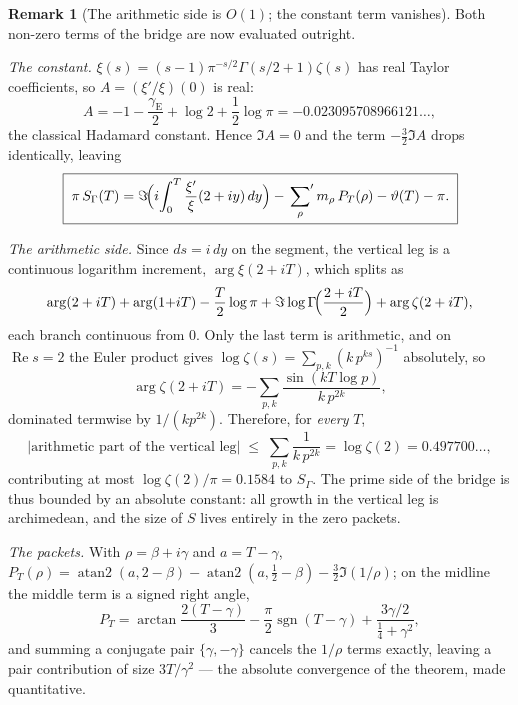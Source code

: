 \documentclass[11pt]{article}
\theoremstyle{definition}
\newtheorem{remark}[theorem]{Remark}
\renewcommand{\Re}{\operatorname{Re}}
\begin{document}
\begin{remark}[The arithmetic side is \(O(1)\); the constant term
vanishes]\label{rem:st-bridge-arithmetic-side}
Both non-zero terms of the bridge are now evaluated outright.

\emph{The constant.}  \(\xi(s)=(s-1)\pi^{-s/2}\Gamma(s/2+1)\zeta(s)\) has real
Taylor coefficients, so \(A=(\xi'/\xi)(0)\) is real:
\[
 A=-1-\frac{\gamma_{\mathrm E}}{2}+\log 2+\frac12\log\pi
  =-0.023095708966121\ldots,
\]
the classical Hadamard constant.  Hence \(\Im A=0\) and the term
\(-\tfrac32\Im A\) drops identically, leaving
\[
\boxed{\;
\pi\,S_\Gamma(T)
=\Im\!\Bigl(i\!\int_0^T\frac{\xi'}{\xi}(2+iy)\,dy\Bigr)
-\sideset{}{'}\sum_{\rho}m_\rho\,P_T(\rho)
-\vartheta(T)-\pi.\;}
\]

\emph{The arithmetic side.}  Since \(ds=i\,dy\) on the segment, the vertical
leg is a continuous logarithm increment, \(\arg\xi(2+iT)\), which splits as
\[
 \arg(2+iT)+\arg(1{+}iT)-\frac T2\log\pi
 +\Im\log\Gamma\!\Bigl(\frac{2+iT}{2}\Bigr)+\arg\zeta(2+iT),
\]
each branch continuous from \(0\).  Only the last term is arithmetic, and on
\(\Re s=2\) the Euler product gives \(\log\zeta(s)=\sum_{p,k}(k\,p^{ks})^{-1}\)
absolutely, so
\[
 \arg\zeta(2+iT)=-\sum_{p,k}\frac{\sin(kT\log p)}{k\,p^{2k}},
\]
dominated termwise by \(1/(k p^{2k})\).  Therefore, for \emph{every} \(T\),
\[
 \bigl|\text{arithmetic part of the vertical leg}\bigr|
 \;\le\;\sum_{p,k}\frac1{k\,p^{2k}}=\log\zeta(2)=0.497700\ldots,
\]
contributing at most \(\log\zeta(2)/\pi=0.1584\) to \(S_\Gamma\).  The prime
side of the bridge is thus bounded by an absolute constant: all growth in the
vertical leg is archimedean, and the size of \(S\) lives entirely in the zero
packets.

\emph{The packets.}  With \(\rho=\beta+i\gamma\) and \(a=T-\gamma\),
\(P_T(\rho)=\operatorname{atan2}(a,2-\beta)-\operatorname{atan2}(a,\tfrac12-\beta)
-\tfrac32\Im(1/\rho)\); on the midline the middle term is a signed right angle,
\[
 P_T=\arctan\frac{2(T-\gamma)}3-\frac\pi2\operatorname{sgn}(T-\gamma)
     +\frac{3\gamma/2}{\tfrac14+\gamma^2},
\]
and summing a conjugate pair \(\{\gamma,-\gamma\}\) cancels the \(1/\rho\)
terms exactly, leaving a pair contribution of size \(3T/\gamma^2\) --- the
absolute convergence of the theorem, made quantitative.


\end{remark}
\end{document}

